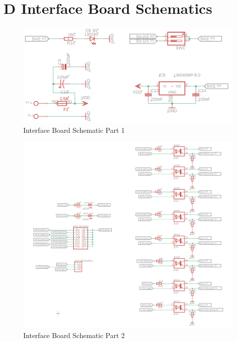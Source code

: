 \documentclass[12pt,a4paper,oneside]{article}
\begin{document}
\begin{landscape}
\begin{table}[H]
{\begin{tabular}{@{}lllllll@{}}
\bottomrule            
\end{tabular}}
\label{tab:Attemp_components}
\end{table}

\newpage


\section*{D \hspace{.5cm} Interface Board Schematics}


%
\begin{figure}[H]
\centering
\includegraphics[width=1\linewidth]{figures/Interface_board_schematic_1.png}
\caption{Interface Board Schematic Part 1}
\label{fig:interface_sch1}
\end{figure}
%

\end{landscape}

%
\begin{figure}[H]
\centering
\includegraphics[width=1.1\linewidth]{figures/Interface_board_schematic_2.png}
\caption{Interface Board Schematic Part 2}
\label{fig:interface_sch2}
\end{figure}
%
\end{document}
